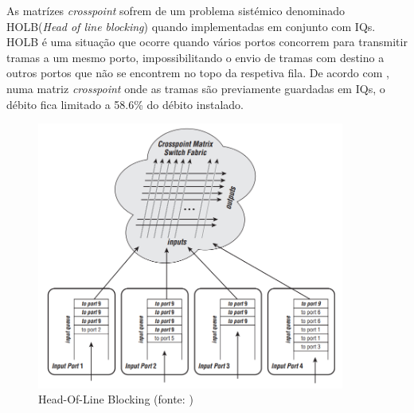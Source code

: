 As matrízes \textit{crosspoint} sofrem de um problema sistémico denominado HOLB(\textit{Head of line blocking}) quando implementadas em conjunto com IQs. HOLB é uma situação que ocorre quando vários portos concorrem para transmitir tramas a um mesmo porto, impossibilitando o envio de tramas com destino a outros portos que não se encontrem no topo da respetiva fila. De acordo com \cite{old}, numa matriz \textit{crosspoint} onde as tramas são previamente guardadas em IQs, o débito fica limitado a 58.6\% do débito instalado. 


\begin{figure}[H]
  \centering
  \includegraphics[width=0.9\textwidth]{HOL.png}
  \caption[Headh-of-line blocking]{Head-Of-Line Blocking (fonte: \cite{make})}
  \label{fig:airbus1}
\end{figure}



